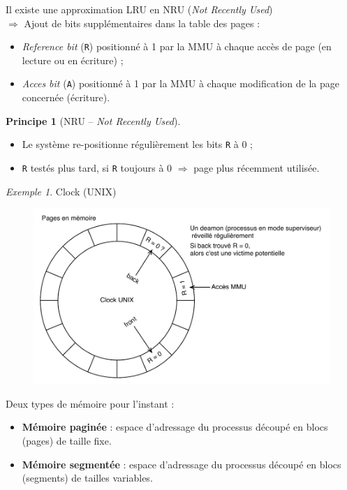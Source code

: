 \documentclass[11pt,english,french]{scrreprt}
\theoremstyle{remark}
\newtheorem*{ex*}{Exemple}
\theoremstyle{definition}
\newtheorem*{ppe*}{Principe}
\begin{document}
Il existe une approximation LRU en NRU (\emph{Not Recently Used})\\
$\Rightarrow$ Ajout de bits supplémentaires dans la table des pages :\begin{itemize}
	\item \emph{Reference bit} (\lstinline!R!) positionné à 1 par la MMU à chaque accès de page (en lecture ou en écriture) ;
	\item \emph{Acces bit} (\lstinline!A!) positionné à 1 par la MMU à chaque modification de la page concernée (écriture).
\end{itemize}

\begin{ppe*}[NRU -- \emph{Not Recently Used}]
	\hfill
	\begin{itemize}
		\item Le système re-positionne régulièrement les bits \lstinline!R! à 0 ;
		\item \lstinline!R! testés plus tard, si \lstinline!R! toujours à 0 $\Rightarrow$ page plus récemment utilisée.
	\end{itemize}

	\begin{ex*}
	Clock (UNIX)
	\begin{figure}[h!]
		\center
		\vspace{-10pt}
		\includegraphics[scale=.85]{img/UNIX-clock}
	\end{figure}
	\end{ex*}	
\end{ppe*}

Deux types de mémoire pour l'instant :\begin{itemize}
	\item \textbf{Mémoire paginée} : espace d'adressage du processus découpé en blocs (pages) de taille fixe.
	\item \textbf{Mémoire segmentée} : espace d'adressage du processus découpé en blocs (segments) de tailles variables.
\end{itemize}
\end{document}
